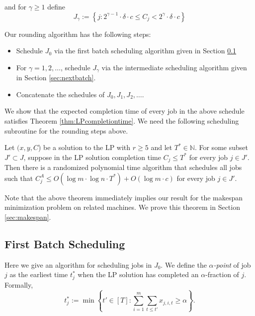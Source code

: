   and for $\gamma \geq 1$ define
  \begin{equation}
  \label{eq:jkdefinition}
  J_\gamma := \left \{ j : 2^{\gamma-1} \cdot \delta \cdot c \leq C_j <  2^{\gamma} \cdot \delta \cdot c \right \}
  \end{equation}
  
  
  \medskip
  Our rounding algorithm has the following steps:
  \begin{itemize}
  \item Schedule $J_0$ via the first batch scheduling algorithm given in Section \ref{sec:firstbatch}
  \item For $\gamma = 1, 2,\ldots$, schedule $J_\gamma$ via the intermediate scheduling algorithm  given in  Section \ref{sec:nextbatch}.
  \item Concatenate the schedules of $J_0, J_1, J_2, \ldots$.
  \end{itemize}
  
  
  We show that the expected completion time of every job in the above schedule satisfies Theorem \ref{thm:LPcompletiontime}. 
  We need the following scheduling subroutine for the rounding steps above.
  
  
  \begin{theorem} \label{thm:RelatedMakespan}
  Let $(x,y,C$) be a solution to the LP with $r \geq 5$ and let $T^* \in \mathbb{N}$.
  For some subset $J' \subset J$, suppose in the LP solution completion time $C_j \leq T^*$ for every job $j \in J'$.
  Then there is a randomized polynomial time algorithm that schedules all jobs such that $C^A_j \leq O(\log m \cdot \log n  \cdot T^*) + O(\log m \cdot c)$ for every job $j \in J'$.
   \end{theorem}
  
  Note that the above theorem immediately implies our result for the makespan minimization problem on related machines.
  We prove this theorem in Section \ref{sec:makespan}.
  
  
  \subsection{First Batch Scheduling}
  \label{sec:firstbatch}
  Here we give an algorithm for scheduling jobs in $J_0$.
  We define the \emph{$\alpha$-point} of job $j$ as the earliest time $t_j^*$ when 
  the LP solution has completed an $\alpha$-fraction of $j$. Formally,
  \begin{equation} \label{eq:RAlphaPoints}
    t^*_j := \min \left\{t' \in [T]:  \sum_{i=1}^{m}  \sum_{t \leq t'} x_{j,i,t} \geq \alpha \right\}.
  \end{equation}
  
